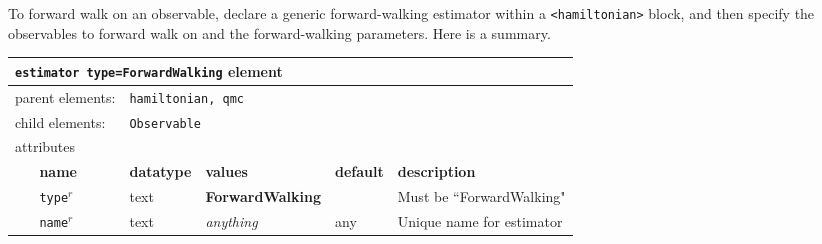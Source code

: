 To forward walk on an observable, declare a generic forward-walking estimator within a \texttt{<hamiltonian>} block, and then specify the observables to forward walk on and the forward-walking parameters.  Here is a summary.\\  

\begin{table}[h]
\begin{center}
\begin{tabularx}{\textwidth}{l l l l l X }
\hline
\multicolumn{6}{l}{\texttt{estimator type=ForwardWalking} element} \\
\hline
\multicolumn{2}{l}{parent elements:} & \multicolumn{4}{l}{\texttt{hamiltonian, qmc}}\\
\multicolumn{2}{l}{child  elements:} & \multicolumn{4}{l}{\texttt{Observable}}\\
\multicolumn{2}{l}{attributes}  & \multicolumn{4}{l}{}\\
   & \bfseries name       & \bfseries datatype & \bfseries values  & \bfseries default   & \bfseries description \\
   & \texttt{type}$^r$    &  text              & \textbf{ForwardWalking}&                & Must be ``ForwardWalking" \\
   & \texttt{name}$^r$    &  text              & \textit{anything} & any                 & Unique name for estimator \\
  \hline
\end{tabularx}
\end{center}
\end{table}

